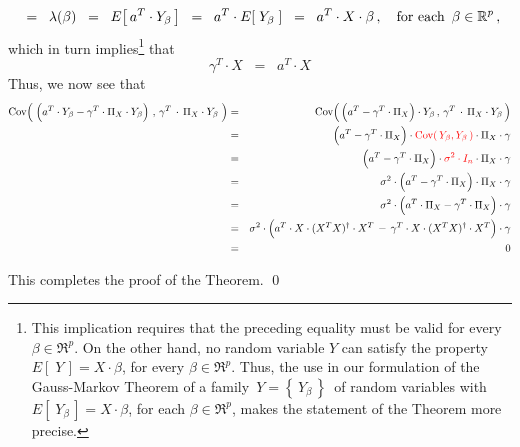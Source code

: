 \begin{enumerate}
\begin{equation*}
	\;\; = \;\;
		\lambda(\beta)
	\;\; = \;\;
		E\!\left[\,a^{T} \cdot Y_{\beta}\,\right]
	\;\; = \;\;
		a^{T} \cdot E\!\left[\;Y_{\beta}\;\right]
	\;\; = \;\;
		a^{T} \cdot X \cdot \beta\,,
	\quad
	\textnormal{for each \,$\beta \in \Re^{p}$}\,,
	\end{equation*}
	which in turn implies{\color{red}\footnote{\color{red}This implication
	requires that the preceding equality must be valid
	for every $\beta \in \Re^{p}$.
	On the other hand, no random variable $Y$ can satisfy the property
	$E\!\left[\;Y\,\right] = X \cdot \beta$, for every $\beta \in \Re^{p}$.
	Thus, the use in our formulation of the Gauss-Markov Theorem
	of a family \,$Y = \left\{\,Y_{\beta}\,\right\}$\, of random variables
	with $E\!\left[\;Y_{\beta}\,\right] = X \cdot \beta$, for each $\beta \in \Re^{p}$,
	makes the statement of the Theorem more precise.}}
	that
	\begin{equation*}
	\gamma^{T} \cdot X
	\;\; = \;\;
		a^{T} \cdot X
	\end{equation*}
	Thus, we now see that
	\begin{eqnarray*}
	\Cov\!\left(\;
		\left(a^{T} \cdot Y_{\beta}
		\overset{{\color{white}.}}{-}
		\gamma^{T} \cdot \Pi_{X} \cdot Y_{\beta}\right)
		\,,\,
		\gamma^{T} \overset{{\color{white}+}}{\cdot} \Pi_{X} \cdot Y_{\beta}
		\;\right)
	&=&
		\Cov\!\left(\,
			\left(a^{T} \overset{{\color{white}.}}{-} \gamma^{T} \cdot \Pi_{X} \right) \cdot Y_{\beta}
			\,,\,
			\gamma^{T} \overset{{\color{white}+}}{\cdot} \Pi_{X} \cdot Y_{\beta}
			\,\right)
	\\
	&=&
		\left(a^{T} \overset{{\color{white}.}}{-} \gamma^{T} \cdot \Pi_{X} \right)
		\cdot {\color{red}\Cov\!\left(\,Y_{\beta},Y_{\beta}\,\right)} \cdot \Pi_{X} \cdot \gamma
	\\
	&=&
		\left(a^{T} \overset{{\color{white}.}}{-} \gamma^{T} \cdot \Pi_{X} \right)
		\cdot {\color{red}\sigma^{2} \cdot I_{n}} \cdot \Pi_{X} \cdot \gamma
	\\
	&=&
		\sigma^{2}
		\cdot
		\left(a^{T} \overset{{\color{white}.}}{-} \gamma^{T} \cdot \Pi_{X} \right)
		\cdot \Pi_{X} \cdot \gamma
	\\
	&=&
		\sigma^{2}
		\cdot
		\left(a^{T} \cdot \Pi_{X} \overset{{\color{white}.}}{-} \gamma^{T} \cdot \Pi_{X} \right)
		\cdot \gamma
	\\
	&=&
		\sigma^{2}
		\cdot
		\left(a^{T} \cdot X\cdot(X^{T}X)^{\dagger}\cdot X^{T}
		\,\overset{{\color{white}.}}{-}\,
		\gamma^{T} \cdot X\cdot(X^{T}X)^{\dagger}\cdot X^{T} \right)
		\cdot \gamma
	\\
	&=&
		0
	\end{eqnarray*}
\end{enumerate}
This completes the proof of the Theorem.
\qed


